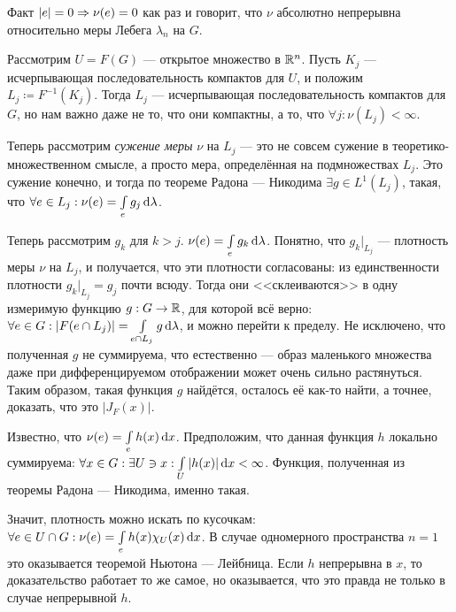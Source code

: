 \documentclass[a4paper]{report}
\begin{document}
    Факт $|e| = 0 \Rightarrow \nu(e) = 0$ как раз и говорит, что $\nu$ абсолютно непрерывна относительно меры Лебега $\lambda_n$ на $G$.

    Рассмотрим $U = F(G)$ --- открытое множество в $\mathbb{R}^n$.
    Пусть $K_j$ --- исчерпывающая последовательность компактов для $U$, и положим $L_j \coloneqq F^{-1}(K_j)$.
    Тогда $L_j$ --- исчерпывающая последовательность компактов для $G$, но нам важно даже не то, что они компактны, а то, что $\forall j: \nu(L_j) < \infty$.

    Теперь рассмотрим \emph{сужение меры} $\nu$ на $L_j$ --- это не совсем сужение в теоретико-множественном смысле, а просто мера, определённая на подмножествах $L_j$.
    Это сужение конечно, и тогда по теореме Радона --- Никодима $\exists g \in L^1(L_j)$, такая, что $\forall e \in L_j: \nu(e) = \int\limits_{e}g_j\operatorname{d}\!\lambda$.

    Теперь рассмотрим $g_k$ для $k > j$. $\nu(e) = \int\limits_{e}g_k\operatorname{d}\!\lambda$.
    Понятно, что $g_k\big|_{L_j}$ --- плотность меры $\nu$ на $L_j$, и получается, что эти плотности согласованы: из единственности плотности $g_k\big|_{L_j} = g_j$ почти всюду.
    Тогда они <<склеиваются>> в одну измеримую функцию $g: G \rightarrow \mathbb{R}$, для которой всё верно: $\forall e \in G: |F(e \cap L_j)| = \int\limits_{e \cap L_j}g \operatorname{d}\!\lambda$, и можно перейти к пределу.
    Не исключено, что полученная $g$ не суммируема, что естественно --- образ маленького множества даже при дифференцируемом отображении может очень сильно растянуться.
    Таким образом, такая функция $g$ найдётся, осталось её как-то найти, а точнее, доказать, что это $|J_F(x)|$.

    Известно, что $\nu(e) = \int\limits_{e}h(x)\operatorname{d}\! x$.
    Предположим, что данная функция $h$ локально суммируема: $\forall x \in G: \exists U \ni x: \int\limits_{U}|h(x)|\operatorname{d}\! x < \infty$.
    Функция, полученная из теоремы Радона --- Никодима, именно такая.

    Значит, плотность можно искать по кусочкам: $\forall e \in U \cap G: \nu(e) = \int\limits_{e}h(x)\chi_U(x)\operatorname{d}\! x$.
    В случае одномерного пространства $n = 1$ это оказывается теоремой Ньютона --- Лейбница.
    Если $h$ непрерывна в $x$, то доказательство работает то же самое, но оказывается, что это правда не только в случае непрерывной $h$.
\end{document}
